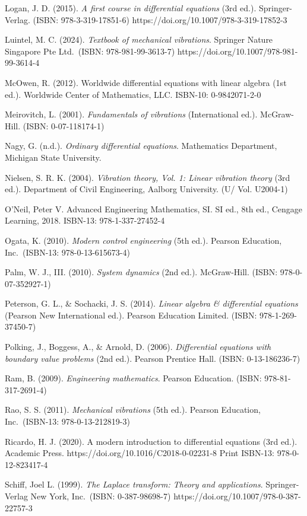 \documentclass[
  11pt,
]{article}
\begin{document}
Logan, J. D. (2015). \emph{A first course in differential equations}
(3rd ed.). Springer-Verlag. (ISBN: 978-3-319-17851-6)
https://doi.org/10.1007/978-3-319-17852-3

Luintel, M. C. (2024). \emph{Textbook of mechanical vibrations}.
Springer Nature Singapore Pte Ltd.~(ISBN: 978-981-99-3613-7)
https://doi.org/10.1007/978-981-99-3614-4

McOwen, R. (2012). Worldwide differential equations with linear algebra
(1st ed.). Worldwide Center of Mathematics, LLC. ISBN-10: 0-9842071-2-0

Meirovitch, L. (2001). \emph{Fundamentals of vibrations} (International
ed.). McGraw-Hill. (ISBN: 0-07-118174-1)

Nagy, G. (n.d.). \emph{Ordinary differential equations}. Mathematics
Department, Michigan State University.

Nielsen, S. R. K. (2004). \emph{Vibration theory, Vol. 1: Linear
vibration theory} (3rd ed.). Department of Civil Engineering, Aalborg
University. (U/ Vol. U2004-1)

O'Neil, Peter V. Advanced Engineering Mathematics, SI. SI ed., 8th ed.,
Cengage Learning, 2018. ISBN-13: 978-1-337-27452-4

Ogata, K. (2010). \emph{Modern control engineering} (5th ed.). Pearson
Education, Inc.~(ISBN-13: 978-0-13-615673-4)

Palm, W. J., III. (2010). \emph{System dynamics} (2nd ed.). McGraw-Hill.
(ISBN: 978-0-07-352927-1)

Peterson, G. L., \& Sochacki, J. S. (2014). \emph{Linear algebra \&
differential equations} (Pearson New International ed.). Pearson
Education Limited. (ISBN: 978-1-269-37450-7)

Polking, J., Boggess, A., \& Arnold, D. (2006). \emph{Differential
equations with boundary value problems} (2nd ed.). Pearson Prentice
Hall. (ISBN: 0-13-186236-7)

Ram, B. (2009). \emph{Engineering mathematics}. Pearson Education.
(ISBN: 978-81-317-2691-4)

Rao, S. S. (2011). \emph{Mechanical vibrations} (5th ed.). Pearson
Education, Inc.~(ISBN-13: 978-0-13-212819-3)

Ricardo, H. J. (2020). A modern introduction to differential equations
(3rd ed.). Academic Press. https://doi.org/10.1016/C2018-0-02231-8 Print
ISBN-13: 978-0-12-823417-4

Schiff, Joel L. (1999). \emph{The Laplace transform: Theory and
applications}. Springer-Verlag New York, Inc.~(ISBN: 0-387-98698-7)
https://doi.org/10.1007/978-0-387-22757-3
\end{document}
